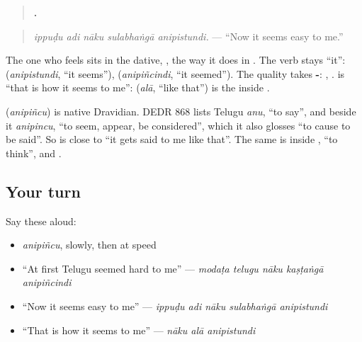 \begin{quote}
\textbf{    .}
\end{quote}

\begin{quote}
\emph{ippuḍu adi nāku sulabhaṅgā anipistundi.} — \textquotedblleft{}Now it seems easy to me.\textquotedblright{}
\end{quote}

The one who feels sits in the dative, \textbf{}, the way it does in \textbf{  }. The verb stays \textquotedblleft{}it\textquotedblright{}: \textbf{} (\emph{anipistundi}, \textquotedblleft{}it seems\textquotedblright{}), \textbf{} (\emph{anipiñcindi}, \textquotedblleft{}it seemed\textquotedblright{}). The quality takes \textbf{-}: \textbf{}, \textbf{}. \textbf{  } is \textquotedblleft{}that is how it seems to me\textquotedblright{}: \textbf{} (\emph{alā}, \textquotedblleft{}like that\textquotedblright{}) is the \textbf{} inside \textbf{}.

\begin{cousinweb}
\textbf{} (\emph{anipiñcu}) is native Dravidian. DEDR 868 lists Telugu \emph{anu}, \textquotedblleft{}to say\textquotedblright{}, and beside it \emph{anipincu}, \textquotedblleft{}to seem, appear, be considered\textquotedblright{}, which it also glosses \textquotedblleft{}to cause to be said\textquotedblright{}. So \textbf{  } is close to \textquotedblleft{}it gets said to me like that\textquotedblright{}. The same \textbf{} is inside \textbf{}, \textquotedblleft{}to think\textquotedblright{}, and \textbf{}.
\end{cousinweb}

\subsection*{Your turn}
Say these aloud:

\begin{itemize}
\raggedright
  \item \emph{anipiñcu}, slowly, then at speed
  \item \textquotedblleft{}At first Telugu seemed hard to me\textquotedblright{} — \emph{modaṭa telugu nāku kaṣṭaṅgā anipiñcindi}
  \item \textquotedblleft{}Now it seems easy to me\textquotedblright{} — \emph{ippuḍu adi nāku sulabhaṅgā anipistundi}
  \item \textquotedblleft{}That is how it seems to me\textquotedblright{} — \emph{nāku alā anipistundi}
\end{itemize}

